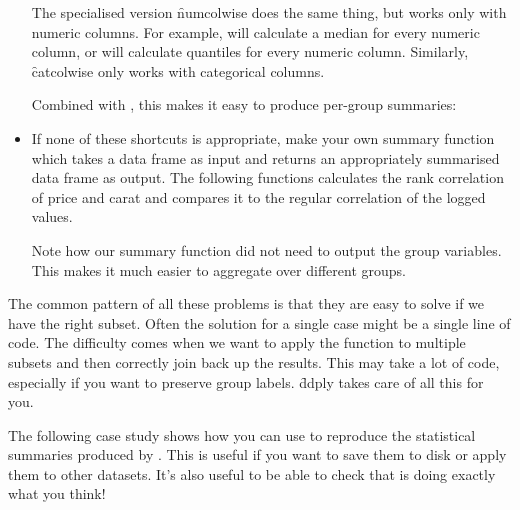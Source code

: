 \begin{itemize}
   The specialised version \f{numcolwise} does the same thing, but works only with numeric columns.  For example,  will calculate a median for every numeric column, or  will calculate quantiles for every numeric column.  Similarly, \f{catcolwise} only works with categorical columns.
  
    
  
  Combined with , this makes it easy to produce per-group summaries:
  
    
  
  \item If none of these shortcuts is appropriate, make your own summary function which takes a data frame as input and returns an appropriately summarised data frame as output.  The following functions calculates the rank correlation of price and carat and compares it to the regular correlation of the logged values.
  
    
  
  Note how our summary function did not need to output the group variables.  This makes it much easier to aggregate over different groups.
\end{itemize}

The common pattern of all these problems is that they are easy to solve if we have the right subset.  Often the solution for a single case might be a single line of code.  The difficulty comes when we want to apply the function to multiple subsets and then correctly join back up the results.  This may take a lot of code, especially if you want to preserve group labels.  \f{ddply} takes care of all this for you.

The following case study shows how you can use  to reproduce the statistical summaries produced by \ggplot.  This is useful if you want to save them to disk or apply them to other datasets.  It's also useful to be able to check that \ggplot is doing exactly what you think!

